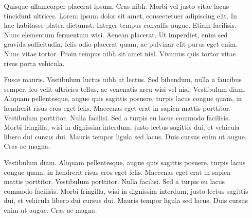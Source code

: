 \documentclass[a4paper, twocolumn]{article}
\begin{document}
Quisque ullamcorper placerat ipsum. Cras nibh. Morbi vel
justo vitae lacus tincidunt ultrices. Lorem ipsum dolor sit amet,
consectetuer adipiscing elit. In hac habitasse platea dictumst.
Integer tempus convallis augue. Etiam facilisis. Nunc elementum
fermentum wisi. Aenean placerat. Ut imperdiet, enim sed gravida
sollicitudin, felis odio placerat quam, ac pulvinar elit purus eget
enim. Nunc vitae tortor. Proin tempus nibh sit amet nisl. Vivamus
quis tortor vitae risus porta vehicula.

Fusce mauris. Vestibulum luctus nibh at lectus. Sed bibendum,
nulla a faucibus semper, leo velit ultricies tellus, ac venenatis arcu
wisi vel nisl. Vestibulum diam. Aliquam pellentesque, augue quis
sagittis posuere, turpis lacus congue quam, in hendrerit risus eros
eget felis. Maecenas eget erat in sapien mattis porttitor. Vestibulum
porttitor. Nulla facilisi. Sed a turpis eu lacus commodo facilisis.
Morbi fringilla, wisi in dignissim interdum, justo lectus sagittis dui,
et vehicula libero dui cursus dui. Mauris tempor ligula sed lacus.
Duis cursus enim ut augue. Cras ac magna.

Vestibulum diam. Aliquam pellentesque, augue quis
sagittis posuere, turpis lacus congue quam, in hendrerit risus eros
eget felis. Maecenas eget erat in sapien mattis porttitor. Vestibulum
porttitor. Nulla facilisi. Sed a turpis eu lacus commodo facilisis.
Morbi fringilla, wisi in dignissim interdum, justo lectus sagittis dui,
et vehicula libero dui cursus dui. Mauris tempor ligula sed lacus.
Duis cursus enim ut augue. Cras ac magna.





  
\end{document}
